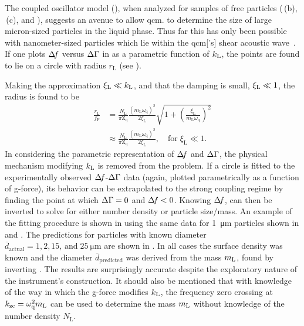 The coupled oscillator model (), when analyzed for
samples of free particles (\,(b),
\,(c), and ), suggests an avenue
to allow \gls{qcm}. to determine the size of large micron-sized particles in the
liquid phase.  Thus far this has only been possible with nanometer-sized
particles which lie within the \gls{qcm}['s] shear acoustic
wave~\cite{olsson2013using}.  If one plots $\Delta\!f$ versus $\Delta\Gamma$ in
 as a parametric function of $k_\mathrm{L}$, the points are
found to lie on a circle with radius $r_\mathrm{L}$ (see
).

Making the approximation $\xi_\mathrm{L}\ll k_\mathrm{L}$, and that the damping
is small, $\xi_\mathrm{L}\ll1$, the radius is found to be
\begin{align}
	\frac{r_\mathrm{L}}{f_\mathrm{F}} & =
	\frac{N_\mathrm{L}}{\pi \mathrm{Z}_\mathrm{q}}
	\frac{{\left(m_\mathrm{L}\omega_\mathrm{q}\right)}^2}{2 \xi_\mathrm{L}}
	\sqrt{1+{\left(\frac{\xi_\mathrm{L}}{m_\mathrm{L}\omega_\mathrm{q}}\right)}^2}             \\
	                                  & \approx \frac{N_\mathrm{L}}{\pi \mathrm{Z}_\mathrm{q}}
	\frac{{\left(m_\mathrm{L}\omega_\mathrm{q}\right)}^2}{2 \xi_\mathrm{L}}, \quad \mathrm{for}\; \xi_\mathrm{L} \ll 1.
	\label{eqn:radius}
\end{align}
In considering the parametric representation of $\Delta\!f$ and $\Delta\Gamma$, the
physical mechanism modifying $k_\mathrm{L}$ is removed from the problem.  If a
circle is fitted to the experimentally observed $\Delta\!f$-$\Delta\Gamma$ data (again,
plotted parametrically as a function of g-force), its behavior can be
extrapolated to the strong coupling regime by finding the point at which
$\Delta\Gamma=0$ and $\Delta\!f<0$.  Knowing $\Delta\!f$,  can then be
inverted to solve for either number density or particle size/mass.  An
example of the fitting procedure is shown in  using
the same data for \SI{1}{\micro\meter} particles shown in
 and .  The predictions for
particles with known diameter $\bar{d}_\mathrm{actual}=1, 2,
	15,\,\mathrm{and}\;\SI{25}{\micro\meter}$ are shown in
.
In all cases the surface density was known and the diameter
$\bar{d}_\text{predicted}$ was derived from the mass $m_\mathrm{L}$, found by
inverting .  The results are surprisingly
accurate despite the exploratory nature of the instrument's construction.
It should also be mentioned that with knowledge of the way in which the
g-force modifies $k_\mathrm{L}$, the frequency zero crossing at
$k_\mathrm{zc}=\omega_\mathrm{q}^2m_\mathrm{L}$ can be used to determine the mass $m_\mathrm{L}$
without knowledge of the number density $N_\mathrm{L}$.

